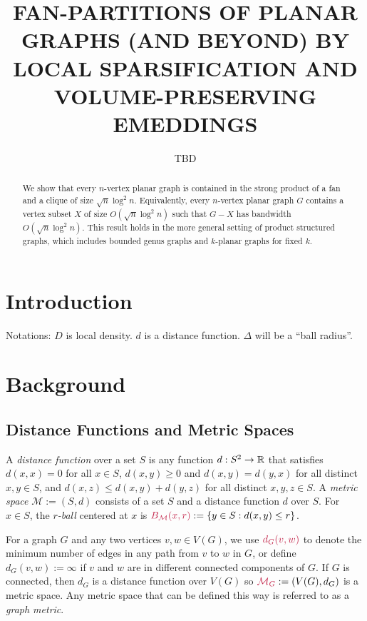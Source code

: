 \documentclass{patmorin}
\title{\MakeUppercase{Fan-Partitions of Planar Graphs (and Beyond)
  \newline by Local Sparsification and Volume-Preserving Emeddings}}
\author{TBD}
\date{}
\makeatletter
\newcommand{\defin}[1]{\emph{\textcolor{brightmaroon}{#1}}}
\def\mathcolor#1#{\@mathcolor{#1}}
\def\@mathcolor#1#2#3{%
  \protect\leavevmode
  \begingroup
    \color#1{#2}#3%
  \endgroup
}
\newcommand{\mathdefin}[1]{\mathcolor{brightmaroon}{#1}}
\makeatother
\begin{document}
\maketitle

\begin{abstract}
  We show that every $n$-vertex planar graph is contained in the strong product of a fan and a clique of size $\sqrt{n}\log^2 n$.  Equivalently, every $n$-vertex planar graph $G$ contains a vertex subset $X$ of size $O(\sqrt{n}\log^2 n)$ such that $G-X$ has bandwidth $O(\sqrt{n}\log^2 n)$.  This result holds in the more general setting of product structured graphs, which includes bounded genus graphs and $k$-planar graphs for fixed $k$.
\end{abstract}

\section{Introduction}


Notations: $D$ is local density.  $d$ is a distance function. $\Delta$ will be a ``ball radius''.


\section{Background}

\subsection{Distance Functions and Metric Spaces}

A \defin{distance function} over a set $S$ is any function $d:S^2\to\mathbb{R}$ that satisfies $d(x,x)=0$ for all $x\in S$, $d(x,y)\ge 0$ and $d(x,y)=d(y,x)$ for all distinct $x,y\in S$, and $d(x,z) \le d(x,y)+d(y,z)$ for all distinct $x,y,z\in S$.  A \defin{metric space} $\mathcal{M}:=(S,d)$ consists of a set $S$ and a distance function $d$ over $S$.  For $x\in S$, the \defin{$r$-ball} centered at $x$ is $\mathdefin{B_{\mathcal{M}}(x,r)}:=\{y\in S:d(x,y)\le r\}$.

For a graph $G$ and any two vertices $v,w\in V(G)$, we use $\mathdefin{d_G(v,w)}$ to denote the minimum number of edges in any path from $v$ to $w$ in $G$, or define $d_G(v,w):=\infty$ if $v$ and $w$ are in different connected components of $G$.  If $G$ is connected, then $d_G$ is a distance function over $V(G)$ so $\mathdefin{\mathcal{M}_G}:=(V(G),d_G)$ is a metric space. Any metric space that can be defined this way is referred to as a \defin{graph metric}.
\end{document}

